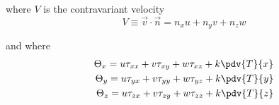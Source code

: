 
\noindent
where $V$ is the contravariant velocity 
%
\begin{equation} V \equiv \vec{v} \cdot \vec{n} = n_x u + n_y v + n_z w \label{eq:contravariant_vel} \end{equation}

\noindent
and where 
%
\begin{align} \begin{split}
  \Theta_x = u\tau_{xx} + v\tau_{xy} + w\tau_{xz} + k\pdv{T}{x} \\
  \Theta_y = u\tau_{yx} + v\tau_{yy} + w\tau_{yz} + k\pdv{T}{y} \\
  \Theta_z = u\tau_{zx} + v\tau_{zy} + w\tau_{zz} + k\pdv{T}{z} 
\end{split} \label{eq:theta} \end{align}

